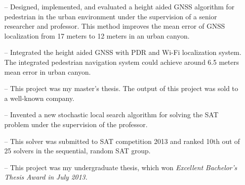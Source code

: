 \documentclass[10pt,a4paper,roman]{moderncv}        %
\begin{document}
\begin{itemize}
  \item[--]{Designed, implemented, and evaluated a height aided GNSS algorithm for
    pedestrian in the urban environment under the supervision of a senior researcher
  and professor. This method improves the mean error of GNSS localization from 17 meters to 12 meters in an urban canyon.}
  \item[--]{Integrated the height aided GNSS with PDR and Wi-Fi localization system. The integrated pedestrian navigation system could achieve around 6.5 meters mean error in urban canyon.}
  \item[--]{This project was my master's thesis. The output of this project was sold to a well-known company.}
\end{itemize}

\begin{itemize}
  \item[--]{Invented a new stochastic local search algorithm for solving the SAT problem under the supervision of the professor.}
  \item[--]{This solver was submitted to SAT competition 2013 and ranked 10th out of 25 solvers in the sequential, random SAT group.}
  \item[--]{This project was my undergraduate thesis, which won \em{Excellent
Bachelor's Thesis Award} in July 2013.}
\end{itemize}
\end{document}
